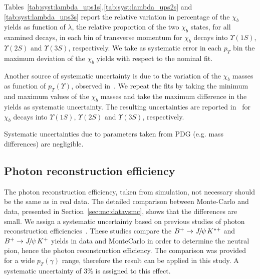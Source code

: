 Tables~\ref{tab:syst:lambda_ups1s},\ref{tab:syst:lambda_ups2s} and
\ref{tab:syst:lambda_ups3s} report the relative variation in percentage of the
$\chi_b$ yields as function of $\lambda$, the relative proportion of the two
$\chi_b$ states, for all examined decays, in each bin of transverse momentum
for $\chi_b$ decays into $\Upsilon(1S)$, $\Upsilon(2S)$ and $\Upsilon(3S)$,
respectively. We take as systematic error in each $p_T$ bin the maximum
deviation of the $\chi_b$ yields with respect to the nominal fit.

Another source of systematic uncertainty is due to the variation of the $\chi_b$ masses as
function of $p_T(\Upsilon)$, observed in~. We repeat the fits by
taking the minimum and maximum values of the $\chi_b$ masses and take the
maximum difference in the yields as systematic uncertainty. The resulting
uncertainties are reported
in~ for $\chi_b$
decays into $\Upsilon(1S)$, $\Upsilon(2S)$ and $\Upsilon(3S)$, respectively.
 
Systematic uncertainties due to parameters taken from PDG (e.g. mass differences)
are negligible.
 
 





\subsection{Photon reconstruction efficiency}
The photon reconstruction efficiency, taken from simulation, not necessary 
should be the same as in real data. The detailed comparison between Monte-Carlo and data,
presented in Section~\ref{sec:mc:datavsmc}, shows that the differences are
small. We assign a systematic uncertainty based on previous studies of photon
reconstruction efficiencies~\cite{Belyaev:1411344}. These studies compare the
$B^+ \to \jpsi K^{*+}$ and $B^+ \to \jpsi K^+$ yields in data and MonteCarlo in
order to determine the neutral pion, hence the photon  reconstruction
efficiency. The comparison was provided for a wide $p_T(\gamma)$ range, therefore
the result can be applied in this study. A systematic uncertainty of 3\%
is assigned to this effect.


